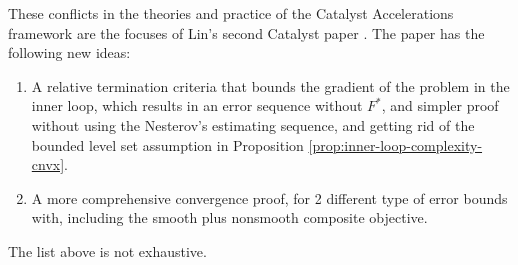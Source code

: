 \documentclass[12pt]{article}
\begin{document}
            \par 
            These conflicts in the theories and practice of the Catalyst Accelerations framework are the focuses of Lin's second Catalyst paper \cite{lin_catalyst_2018}. 
            The paper has the following new ideas: 
            \begin{enumerate}
                \item A relative termination criteria that bounds the gradient of the problem in the inner loop, which results in an error sequence without $F^*$, and simpler proof without using the Nesterov's estimating sequence, and getting rid of the bounded level set assumption in Proposition \ref{prop:inner-loop-complexity-cnvx}. 
                \item A more comprehensive convergence proof, for 2 different type of error bounds with, including the smooth plus nonsmooth composite objective. 
            \end{enumerate}
            The list above is not exhaustive. 
\end{document}
